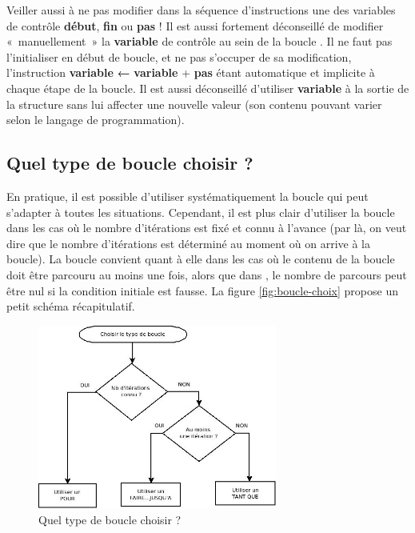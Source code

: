 		Veiller aussi à ne pas modifier dans la séquence d’instructions une des
		variables de contrôle \textbf{début}, \textbf{fin} ou \textbf{pas} ! Il
		est aussi fortement déconseillé de modifier «~manuellement~» la
		\textbf{variable} de contrôle au sein de la boucle
		. Il ne faut pas l’initialiser en début de boucle,
		et ne pas s’occuper de sa modification, l’instruction \textbf{variable}
		{\textsf{\textbf{←}}} \textbf{variable} +
		\textbf{pas} étant automatique et implicite à chaque étape de la
		boucle. Il est aussi déconseillé d’utiliser \textbf{variable} à la
		sortie de la structure  sans lui affecter une
		nouvelle valeur (son contenu pouvant varier selon le langage de
		programmation).

	\subsection{Quel type de boucle choisir ?}

		En pratique, il est possible d’utiliser systématiquement la boucle 
		 qui peut s’adapter à toutes les situations. 
		Cependant, il est plus clair d’utiliser la boucle  
		dans les cas où le nombre d’itérations est fixé et connu à l’avance 
		(par là, on veut dire que le nombre d'itérations est déterminé au moment 
		où on arrive à la boucle). 
		La boucle  convient quant à elle
		dans les cas où le contenu de la boucle doit être parcouru au moins une
		fois, alors que dans , 
		le nombre de parcours peut être nul si la condition initiale est fausse. 
		La figure \vref{fig:boucle-choix} propose un petit schéma récapitulatif.

		\begin{figure}[h]
		\centering
		\includegraphics[width=0.7\textwidth]{image/boucle-choixtype}
		\caption{Quel type de boucle choisir ?}
		\label{fig:boucle-choix}
		\end{figure}

